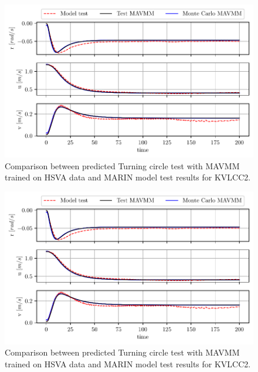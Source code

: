 \begin{figure}[!htb]
\centering
\includegraphics{kappa/images/16.pdf}
\caption{Comparison between predicted Turning circle test with MAVMM trained on HSVA data and MARIN model test results for KVLCC2.}\label{\detokenize{06.20_results_kvlcc2:fig-kvlcc2-track-plot-testing-sim}}\end{figure}

\begin{figure}[!htb]
\centering
\includegraphics{kappa/images/17.pdf}
\caption{Comparison between predicted Turning circle test with MAVMM trained on HSVA data and MARIN model test results for KVLCC2.}\label{\detokenize{06.20_results_kvlcc2:fig-kvlcc2-testing-sim}}\end{figure}

